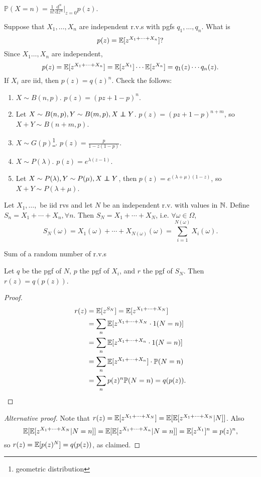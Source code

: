 \begin{proposition}
    $\displaystyle \mathbb{P}(X=n) = \frac{1}{n!}\frac{\mathrm{d}^n}{\mathrm{d}z^n}\Big|_{z=0}p(z) .$ 
\end{proposition}

\begin{example}
    Suppose that $ X_1,\dots,X_n $ are independent r.v.s with pgfs $ q_1,\dots,q_n $. What is 
    \[
        p(z) = {\mathbb{E}}[z^{X_1+\cdots+X_n}]?
    \]
    Since $ X_1\dots,X_n $ are independent, 
    \[
        p(z)= {\mathbb{E}}[z^{X_1+\cdots+X_n}] = {\mathbb{E}}[z^{X_1}]\cdots {\mathbb{E}}[z^{X_n}]=q_1(z)\cdots q_n(z).
    \]
    If $X_i$ are iid, then $p(z)=q(z)^n$. Check the follows:
    \begin{enumerate}
        \item $ X \sim B(n,p) $. $ p(z) = (pz+1-p)^n $.
        \item Let $ X \sim B(n,p), Y \sim B(m,p), X \independent Y $. $ p(z) = (pz+1-p)^{n+m} $, so $ X+Y \sim B(n+m,p) $.
        \item $ X \sim G(p) $\footnote{geometric distribution}. $\displaystyle p(z) = \frac{p}{1-z(1-p)} $.
        \item $ X \sim P(\lambda) $. $p(z) = e^{\lambda(z-1)} $.
        \item Let $ X \sim P(\lambda), Y \sim P(\mu),X \independent Y $, then $ p(z)=e^{(\lambda+\mu)(1-z)} $, so $ X+Y \sim P(\lambda+\mu) $.
    \end{enumerate}
\end{example}

\begin{definition}
    Let $ X_1,\dots, $ be iid rvs and let $N$ be an independent r.v. with values in ${\mathbb{N}}$. Define $S_n = X_1+\cdots+X_n,\forall n$. Then $ S_N=X_1+\cdots+X_N $, i.e. $ \forall \omega\in \Omega $, 
    \[
        S_N(\omega) = X_1(\omega)+\cdots+X_{N(\omega)}(\omega) = \sum_{i=1}^{N(\omega)}X_i(\omega).
    \]
\end{definition}
Sum of a random number of r.v.s
\begin{proposition}
    Let $q$ be the pgf of $N$, $p$ the pgf of $X_i$, and $r$ the pgf of $S_N$. Then $ r(z)=q(p(z)) $.
\end{proposition} 
\begin{proof}
    \begin{align*}
        r(z)&= {\mathbb{E}}[z^{S_N}] = {\mathbb{E}}[z^{X_1+\cdots+X_N}]\\ 
        &= \sum_{n} {\mathbb{E}}[z^{X_1+\cdots+X_N} \cdot 1(N=n)]\\ 
        &= \sum_{n} {\mathbb{E}}[z^{X_1+\cdots+X_n} \cdot 1(N=n)]\\ 
        &= \sum_n {\mathbb{E}}[z^{X_1+\cdots+X_n}] \cdot \mathbb{P}(N=n)\\ 
        &= \sum_n p(z)^n \mathbb{P}(N=n) = q(p(z)).\qedhere
    \end{align*}
\end{proof}
\begin{proof}[Alternative proof]
    Note that $ r(z)= {\mathbb{E}}[z^{X_1+\cdots+X_N}] = {\mathbb{E}}[{\mathbb{E}}[z^{X_1+\cdots+X_N}|N]] $. Also 
    \[
        {\mathbb{E}}[{\mathbb{E}}[z^{X_1+\cdots+X_N}|N=n]]={\mathbb{E}}[{\mathbb{E}}[z^{X_1+\cdots+X_n}|N=n]]={\mathbb{E}}[z^{X_1}]^n = p(z)^n,
    \]
    so $ r(z)={\mathbb{E}}[p(z)^N] = q(p(z)) $, as claimed.
\end{proof}

